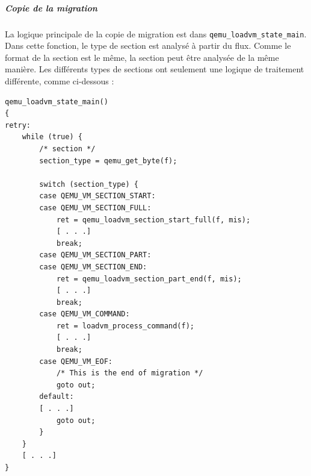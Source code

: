 \subparagraph*{Copie de la migration}
La logique principale de la copie de migration est dans \texttt{qemu\_loadvm\_state\_main}.
Dans cette fonction, le type de section est analysé à partir du flux.
Comme le format de la section est le même, la section peut être analysée de la même manière.
Les différents types de sections ont seulement une logique de traitement différente, comme ci-dessous : 
\begin{lstlisting}[caption={Code responsable de la phase de copie},captionpos=b]
qemu_loadvm_state_main()
{       
retry:
    while (true) {
    	/* section */
        section_type = qemu_get_byte(f);
          
        switch (section_type) {
        case QEMU_VM_SECTION_START:
        case QEMU_VM_SECTION_FULL:
            ret = qemu_loadvm_section_start_full(f, mis);
			[ . . .]
            break;
        case QEMU_VM_SECTION_PART:
        case QEMU_VM_SECTION_END:
            ret = qemu_loadvm_section_part_end(f, mis);
            [ . . .]
            break;   
        case QEMU_VM_COMMAND:
            ret = loadvm_process_command(f);
    		[ . . .]
            break;
        case QEMU_VM_EOF:
            /* This is the end of migration */
            goto out;
        default:
        [ . . .]
            goto out;
        }
    }
    [ . . .]
}

\end{lstlisting}

